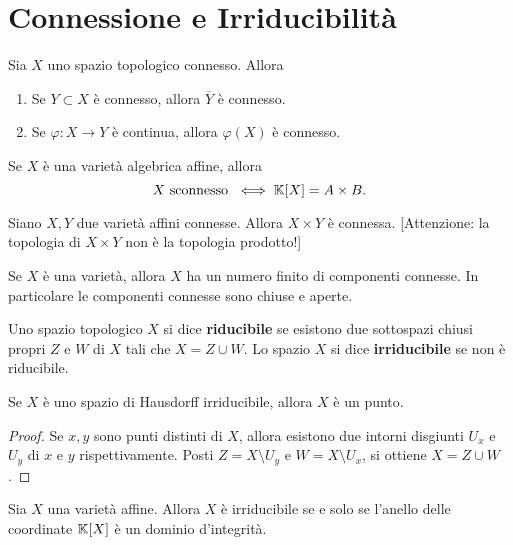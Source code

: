 \section{Connessione e Irriducibilit\`a}
Sia $X$ uno spazio topologico connesso. Allora
\begin{enumerate}
    \item Se $Y\subset X$ è connesso, allora $\overline{Y}$ è connesso.
    \item Se $\varphi\colon X \to Y$ è continua, allora $\varphi(X)$ è connesso.
\end{enumerate}

\begin{exercise}
    Se $X$ è una varietà algebrica affine, allora \[X \text{ sconnesso } \iff \mathbb{K}[X]=A\times B.\]
\end{exercise}

\begin{exercise}
    Siano $X,Y$ due varietà affini connesse. Allora $X\times Y$ è connessa. [Attenzione: la topologia di $X\times Y$ non è la topologia prodotto!]
\end{exercise}

\begin{exercise}
    Se $X$ è una varietà, allora $X$ ha un numero finito di componenti connesse. In particolare le componenti connesse sono chiuse e aperte.
\end{exercise}

\begin{definition}
    Uno spazio topologico $X$ si dice \textbf{riducibile} se esistono due sottospazi chiusi propri $Z$ e $W$ di $X$ tali che $X=Z\cup W$. Lo spazio $X$ si dice \textbf{irriducibile} se non è riducibile.
\end{definition}

\begin{remark}
    Se $X$ è uno spazio di Hausdorff irriducibile, allora $X$ è un punto.
\end{remark}
\begin{proof}
    Se $x,y$ sono punti distinti di $X$, allora esistono due intorni disgiunti $U_x$ e $U_y$ di $x$ e $y$ rispettivamente. Posti $Z=X\setminus U_y$ e $W=X\setminus U_x$, si ottiene $X=Z\cup W$.
\end{proof}

\begin{remark}
    Sia $X$ una varietà affine. Allora $X$ è irriducibile se e solo se l'anello delle coordinate $\mathbb{K}[X]$ è un dominio d'integrità.
\end{remark}


